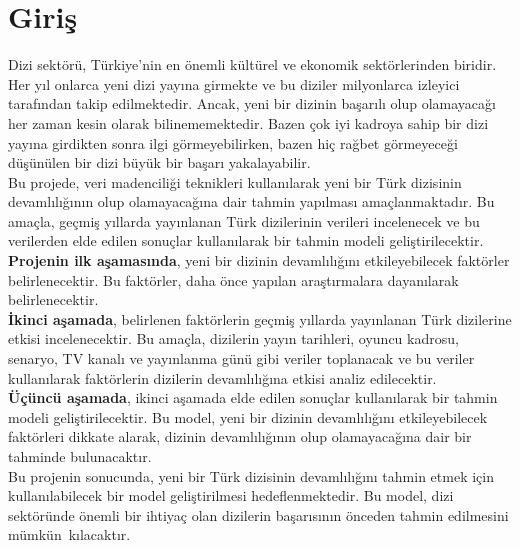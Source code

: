 \section{Giriş}

\indent Dizi sektörü, Türkiye'nin en önemli kültürel ve ekonomik sektörlerinden biridir. Her yıl onlarca yeni dizi yayına girmekte ve bu diziler milyonlarca izleyici tarafından takip edilmektedir. Ancak, yeni bir dizinin başarılı olup olamayacağı her zaman kesin olarak bilinememektedir. Bazen çok iyi kadroya sahip bir dizi yayına girdikten sonra ilgi görmeyebilirken, bazen hiç rağbet görmeyeceği düşünülen bir dizi büyük bir başarı yakalayabilir. \\
\indent Bu projede, veri madenciliği teknikleri kullanılarak yeni bir Türk dizisinin devamlılığının olup olamayacağına dair tahmin yapılması amaçlanmaktadır. Bu amaçla, geçmiş yıllarda yayınlanan Türk dizilerinin verileri incelenecek ve bu verilerden elde edilen sonuçlar kullanılarak bir tahmin modeli geliştirilecektir. \\
\indent \textbf{Projenin ilk aşamasında}, yeni bir dizinin devamlılığını etkileyebilecek faktörler belirlenecektir. Bu faktörler, daha önce yapılan araştırmalara dayanılarak belirlenecektir. \\
\indent \textbf{İkinci aşamada}, belirlenen faktörlerin geçmiş yıllarda yayınlanan Türk dizilerine etkisi incelenecektir. Bu amaçla, dizilerin yayın tarihleri, oyuncu kadrosu, senaryo, TV kanalı ve yayınlanma günü gibi veriler toplanacak ve bu veriler kullanılarak faktörlerin dizilerin devamlılığına etkisi analiz edilecektir.\\ 
\indent \textbf{Üçüncü aşamada}, ikinci aşamada elde edilen sonuçlar kullanılarak bir tahmin modeli geliştirilecektir. Bu model, yeni bir dizinin devamlılığını etkileyebilecek faktörleri dikkate alarak, dizinin devamlılığının olup olamayacağına dair bir tahminde bulunacaktır. \\
Bu projenin sonucunda, yeni bir Türk dizisinin devamlılığını tahmin etmek için kullanılabilecek bir model geliştirilmesi hedeflenmektedir. Bu model, dizi sektöründe önemli bir ihtiyaç olan dizilerin başarısının önceden tahmin edilmesini mümkün kılacaktır.